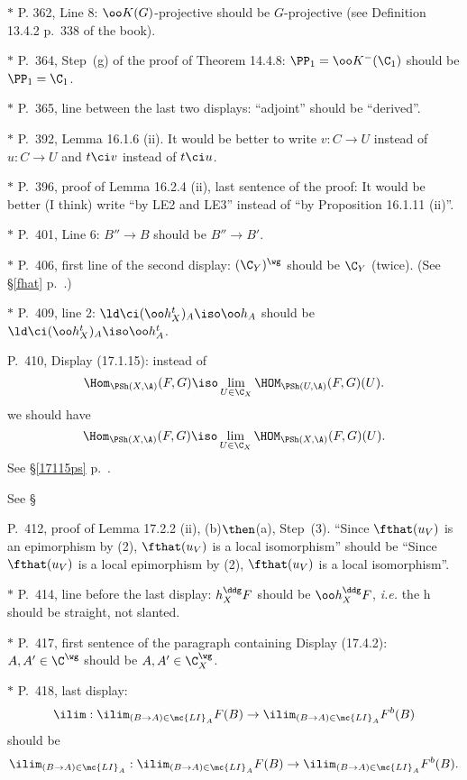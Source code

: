 \documentclass[12pt]{article}
\theoremstyle{remark}
\theoremstyle{definition}
\begin{document}
\nn$*$ P. 362, Line 8: $\oo K(G)$-projective should be $G$-projective (see Definition 13.4.2 p.~338 of the book).

\nn$*$ P.~364, Step~(g) of the proof of Theorem 14.4.8: $\PP_1=\oo K^-(\C_1)$ should be $\PP_1=\C_1$.

\nn$*$ P.~365, line between the last two displays: ``adjoint'' should be ``derived''.

\nn$*$ P.~392, Lemma 16.1.6 (ii). It would be better to write $v:C\to U$ instead of $u:C\to U$ and $t\ci v$ instead of $t\ci u$.

\nn$*$ P.~396, proof of Lemma 16.2.4 (ii), last sentence of the proof: It would be better (I think) write ``by LE2 and LE3'' instead of ``by Proposition 16.1.11 (ii)''.

\nn$*$ P.~401, Line 6: $B''\to B$ should be $B''\to B'$.

\nn$*$ P.~406, first line of the second display: $(\C_Y)^\wg$ should be $\C_Y$ (twice). (See \S\ref{fhat} p.~.)

\nn$*$ P.~409, line 2: $\ld\ci(\oo h_X^t)_A\iso\oo h_A$ should be $\ld\ci(\oo h_X^t)_A\iso\oo h_A^t$. 

\begin{s}
P.~410, Display (17.1.15): instead of 
$$
\Hom_{\PSh(X,\A)}(F,G)\iso\lim_{U\in\C_X}\HOM_{\PSh(U,\A)}(F,G)(U).
$$
we should have
$$
\Hom_{\PSh(X,\A)}(F,G)\iso\lim_{U\in\C_X}\HOM_{\PSh(X,\A)}(F,G)(U).
$$ 
See \S\ref{17115ps} p.~. 
\end{s}
See \S
%

\begin{s}
P.~412, proof of Lemma 17.2.2 (ii), (b)$\then$(a), Step~(3). ``Since $\fthat(u_V)$ is an epimorphism by (2), $\fthat(u_V)$ is a local isomorphism'' should be ``Since $\fthat(u_V)$ is a local epimorphism by (2), $\fthat(u_V)$ is a local isomorphism''.
\end{s}

\nn$*$ P.~414, line before the last display: $h_X^\ddg F$ should be $\oo h_X^\ddg F$, \emph{i.e.} the h should be straight, not slanted. 

\nn$*$ P.~417, first sentence of the paragraph containing Display (17.4.2): $A,A'\in\C^\wg$ should be $A,A'\in\C_X^\wg$. 

\nn$*$ P.~418, last display: 
$$
\ilim:\ilim_{(B\to A)\in\mc{LI}_A}F(B)\to\ilim_{(B\to A)\in\mc{LI}_A}F^b(B)
$$ 
should be 
$$
\ilim_{(B\to A)\in\mc{LI}_A}:\ilim_{(B\to A)\in\mc{LI}_A}F(B)\to\ilim_{(B\to A)\in\mc{LI}_A}F^b(B).
$$
\end{document}
